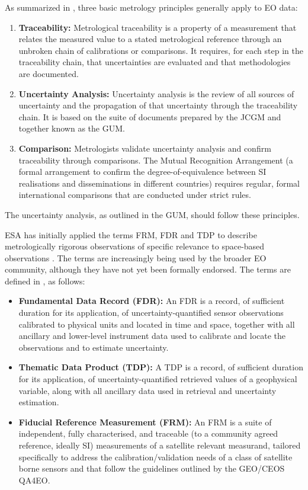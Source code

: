 As summarized in \cite{QA4EO2}, three basic metrology principles generally
apply to \ac{EO} data:

\begin{enumerate}
  \item {\bf Traceability:}  Metrological traceability is a property of a measurement that relates the measured value to a stated metrological reference through an unbroken chain of calibrations or comparisons. It requires, for each step in the traceability chain, that uncertainties are evaluated and that methodologies are documented.
  \item {\bf Uncertainty Analysis:} Uncertainty analysis is the review of all sources of uncertainty and the propagation of that uncertainty through the traceability chain. It is based on the suite of documents prepared by the \ac{JCGM} and together known as the \ac{GUM}.
  \item {\bf Comparison:} Metrologists validate uncertainty analysis and confirm traceability through comparisons. The Mutual Recognition Arrangement (a formal arrangement to confirm the degree-of-equivalence between \ac{SI} realisations and disseminations in different countries) requires regular, formal international comparisons that are conducted under strict rules.
\end{enumerate}

\noindent The uncertainty analysis, as outlined in the \ac{GUM}, should follow these principles.

\ac{ESA} has initially applied the terms \acf{FRM}, \acf{FDR} and \acf{TDP} to
describe metrologically rigorous observations of specific relevance to
space-based observations \cite{QA4EO2}. The terms are increasingly being used
by the broader \ac{EO} community, although they have not yet been formally
endorsed. The terms are defined in \cite{QA4EO2}, as follows:

\begin{itemize}
  \item {\bf Fundamental Data Record (FDR):} An \ac{FDR} is a record, of sufficient duration for its application, of uncertainty-quantified sensor observations calibrated to physical units and located in time and space, together with all ancillary and lower-level instrument data used to calibrate and locate the observations and to estimate uncertainty.
  \item {\bf Thematic Data Product (TDP):} A \ac{TDP} is a record, of sufficient duration for its application, of uncertainty-quantified retrieved values of a geophysical variable, along with all ancillary data used in retrieval and uncertainty estimation.
  \item {\bf Fiducial Reference Measurement (FRM):} An \ac{FRM} is a suite of independent, fully characterised, and traceable (to a community agreed reference, ideally \ac{SI}) measurements of a satellite relevant \gls{measurand}, tailored specifically to address the calibration/validation needs of a class of satellite borne sensors and that follow the guidelines outlined by the \ac{GEO}/\ac{CEOS} \ac{QA4EO}.
\end{itemize}

